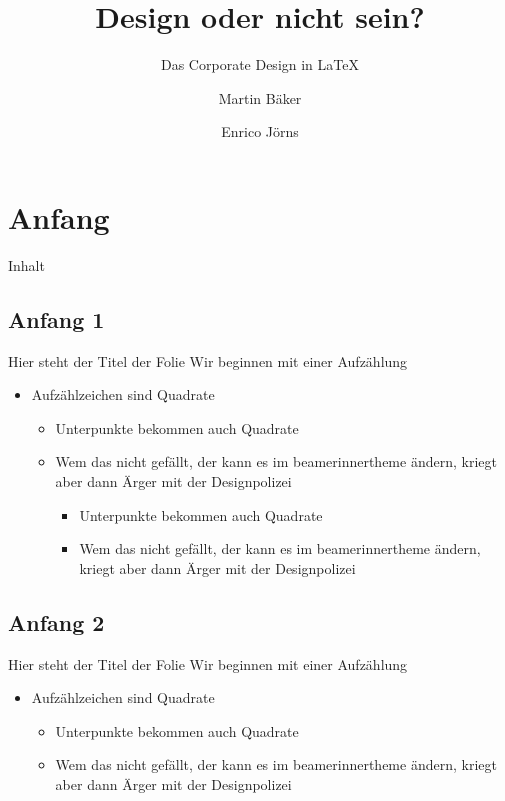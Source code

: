 \documentclass[fleqn,10pt,t,tocinheader,widetoc]{beamer}
\title{Design oder nicht sein?}
\subtitle{Das Corporate Design in  LaTeX}
\author{Martin Bäker\and Enrico Jörns}
\begin{document}
\begin{frame}[plain]
\titlepage
\end{frame}

\section{Anfang}

\begin{frame}{Inhalt}
\tableofcontents
\end{frame}

\subsection{Anfang 1}

\begin{frame}{Hier steht der Titel der Folie}
Wir beginnen mit einer Aufzählung
\begin{itemize}
  \item Aufzählzeichen sind Quadrate
  \begin{itemize}
    \item Unterpunkte bekommen auch Quadrate
    \item Wem das nicht gefällt, der kann es im beamerinnertheme ändern,
      kriegt aber dann Ärger mit der Designpolizei
    \begin{itemize}
      \item Unterpunkte bekommen auch Quadrate
      \item Wem das nicht gefällt, der kann es im beamerinnertheme ändern,
        kriegt aber dann Ärger mit der Designpolizei
    \end{itemize}
  \end{itemize}
\end{itemize}

\end{frame}

\subsection{Anfang 2}

\begin{frame}{Hier steht der Titel der Folie}
Wir beginnen mit einer Aufzählung
\begin{itemize}
\item Aufzählzeichen sind Quadrate
\begin{itemize}
\item Unterpunkte bekommen auch Quadrate
\item Wem das nicht gefällt, der kann es im beamerinnertheme ändern,
  kriegt aber dann Ärger mit der Designpolizei
\end{itemize}
\end{itemize}

\end{frame}
\end{document}
